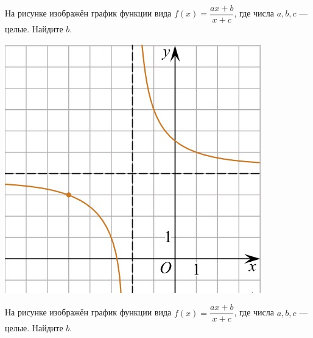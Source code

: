 \begin{class}[number=6]
\begin{listofex}
\begin{minipage}[c]{0.25\textwidth}
		\end{minipage}
		\item
		\begin{minipage}[t]{0.67\textwidth}
			На рисунке изображён график функции вида \(f(x)=\dfrac{ax+b}{x+c}\), где числа \(a, b, c\) --- целые. Найдите \(b\).
		\end{minipage}
		\begin{minipage}[c]{0.25\textwidth}
			\includegraphics[align=t, width=\textwidth]{pics/G101M4C6-5.jpg}
		\end{minipage}
		\item
		\begin{minipage}[t]{0.67\textwidth}
			На рисунке изображён график функции вида \(f(x)=\dfrac{ax+b}{x+c}\), где числа \(a, b, c\) --- целые. Найдите \(b\).
		\end{minipage}
		\begin{minipage}[c]{0.25\textwidth}

\end{minipage}
\end{listofex}
\end{class}

